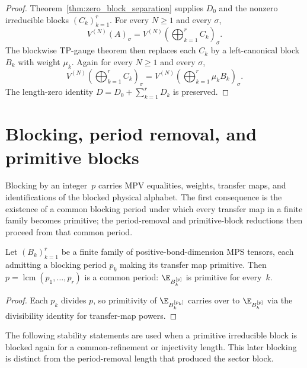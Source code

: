 \begin{proof}\leanok
    Theorem~\ref{thm:zero_block_separation} supplies $D_0$ and the nonzero
    irreducible blocks $(C_k)_{k=1}^r$. For every $N \ge 1$ and every $\sigma$,
    \[
        V^{(N)}(A)_\sigma
        = V^{(N)}\!(\textstyle\bigoplus_{k=1}^r C_k)_\sigma.
    \]
    The blockwise TP-gauge theorem then replaces each $C_k$ by a
    left-canonical block $B_k$ with weight $\mu_k$. Again for every $N \ge 1$
    and every $\sigma$,
    \[
        V^{(N)}\!(\textstyle\bigoplus_{k=1}^r C_k)_\sigma
        =
        V^{(N)}\!(\textstyle\bigoplus_{k=1}^r \mu_k B_k)_\sigma.
    \]
    The length-zero identity $D = D_0 + \sum_{k=1}^r D_k$ is preserved.
\end{proof}

\section{Blocking, period removal, and primitive blocks}%
\label{sec:blocking_infrastructure}

Blocking by an integer~$p$ carries MPV equalities, weights, transfer maps, and
identifications of the blocked physical alphabet. The first consequence is the
existence of a common blocking period under which every transfer map in a finite
family becomes primitive; the period-removal and primitive-block reductions then
proceed from that common period.

\begin{theorem}%
    \label{thm:common_blocking_period}
    \leanok
    Let $(B_k)_{k=1}^r$ be a finite family of positive-bond-dimension MPS
    tensors, each admitting a blocking period $p_k$ making its transfer map
    primitive. Then $p = \operatorname{lcm}(p_1, \ldots, p_r)$ is a common
    period: $\E_{B_k^{[p]}}$ is primitive for every~$k$.
\end{theorem}

\begin{proof}\leanok
    Each $p_k$ divides $p$, so primitivity of $\E_{B_k^{[p_k]}}$ carries over to
    $\E_{B_k^{[p]}}$ via the divisibility identity for transfer-map powers.
\end{proof}

The following stability statements are used when a primitive irreducible block
is blocked again for a common-refinement or injectivity length. This later
blocking is distinct from the period-removal length that produced the sector
block.

